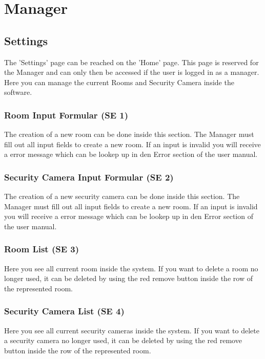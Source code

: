 \chapter{Manager}
\label{chap:appendix_Manager}


\section{Settings}
\label{sec:appendix_Settings}
\mbox{} \par
\noindent{}

The 'Settings' page can be reached on the 'Home' page. This page is reserved for
the Manager and can only then be accessed if the user is logged in as a manager.
Here you can manage the current Rooms and Security Camera inside the software.

\subsection{Room Input Formular (SE 1)}
The creation of a new room can be done inside this section. The Manager must
fill out all input fields to create a new room. If an input is invalid you will
receive a error message which can be lookep up in den Error section of the user
manual.

\subsection{Security Camera Input Formular (SE 2)}
The creation of a new security camera can be done inside this section. The
Manager must fill out all input fields to create a new room. If an input is
invalid you will receive a error message which can be lookep up in den Error
section of the user manual.

\subsection{Room List (SE 3)}
Here you see all current room inside the system. If you want to delete a room no
longer used, it can be deleted by using the red remove button inside the row of
the represented room.

\subsection{Security Camera List (SE 4)}
Here you see all current security cameras inside the system. If you want to
delete a security camera no longer used, it can be deleted by using the red
remove button inside the row of the represented room.


